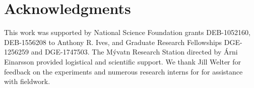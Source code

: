 \documentclass[12pt]{article}
\begin{document}



















\section*{Acknowledgments}

This work was supported by National Science Foundation grants 
DEB-1052160, DEB-1556208 to Anthony R. Ives,
and Graduate Research Fellowships DGE-1256259 and DGE-1747503.
The M\'{y}vatn Research Station directed by \'{A}rni Einarsson
provided logistical and scientific support.
We thank Jill Welter for feedback on the experiments
and numerous research interns for for assistance with fieldwork.

\end{document}
